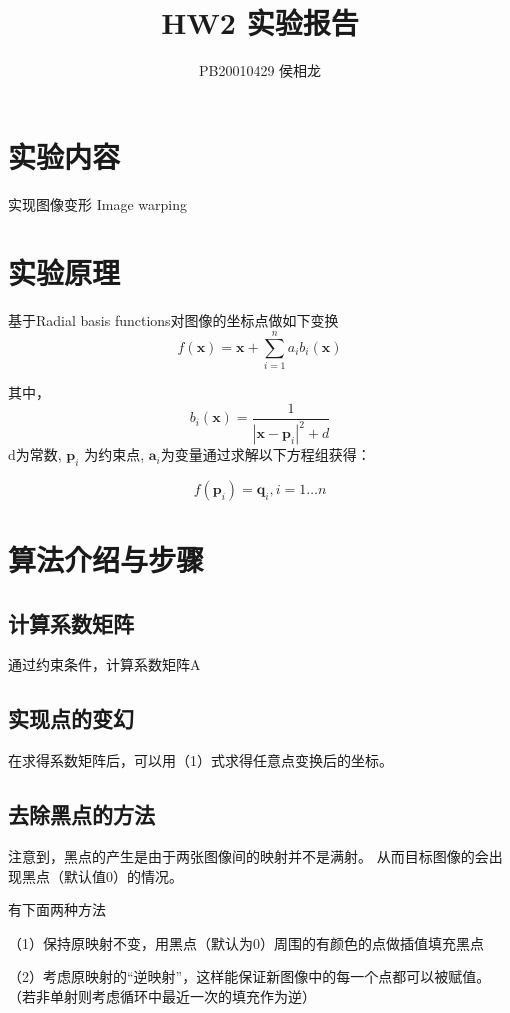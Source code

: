 \documentclass{article}
\title{HW2 实验报告}
\author{PB20010429 侯相龙}
\begin{document}
\maketitle
\section{实验内容}
实现图像变形 Image warping

\section{实验原理}
基于Radial basis functions对图像的坐标点做如下变换
\begin{equation}
    f(\boldsymbol{x}) =\boldsymbol{x}+\sum_{i=1}^{n} a_{i} b_{i}(\boldsymbol{x})
\end{equation}
    
其中，
\[
    b_{i}(\boldsymbol{x}) =\frac{1}{\left|\boldsymbol{x}-\boldsymbol{p}_{i}\right|^{2}+d}
\]
d为常数,  $\boldsymbol{p}_{i}$  为约束点,  $\boldsymbol{a}_{i}$为变量通过求解以下方程组获得：

\[f\left(\boldsymbol{p}_{i}\right)=\boldsymbol{q}_{i}, i=1 \ldots n\]

\section{算法介绍与步骤}

\subsection{计算系数矩阵}
通过约束条件，计算系数矩阵A

\subsection{实现点的变幻}
在求得系数矩阵后，可以用（1）式求得任意点变换后的坐标。

\subsection{去除黑点的方法}
注意到，黑点的产生是由于两张图像间的映射并不是满射。
从而目标图像的会出现黑点（默认值0）的情况。

有下面两种方法

（1）保持原映射不变，用黑点（默认为0）周围的有颜色的点做插值填充黑点

（2）考虑原映射的“逆映射”，这样能保证新图像中的每一个点都可以被赋值。
（若非单射则考虑循环中最近一次的填充作为逆）
\end{document}
